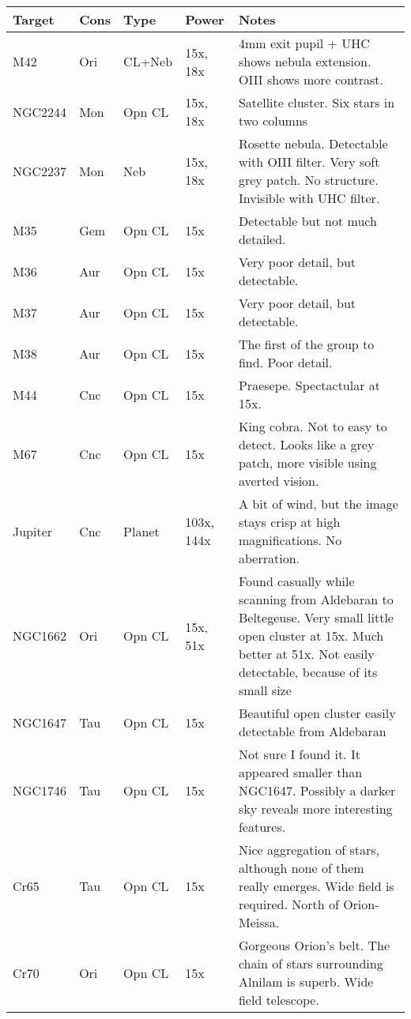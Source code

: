 \begin{longtable}{ p{0.8in}  p{0.3in}  p{0.5in}  p{0.9in}  p{5.8in} }
\hline 
{\bf Target} & {\bf Cons} & {\bf Type} & {\bf Power} & {\bf Notes} \\ 
\hline 
M42 & Ori & CL+Neb & 15x, 18x & 4mm exit pupil + UHC shows nebula extension. OIII shows more contrast. \\ 
NGC2244 & Mon & Opn CL & 15x, 18x & Satellite cluster. Six stars in two columns  \\ 
NGC2237 & Mon & Neb & 15x, 18x & Rosette nebula. Detectable with OIII filter. Very soft grey patch. No structure. Invisible with UHC filter. \\ 
M35 & Gem & Opn CL & 15x & Detectable but not much detailed. \\ 
M36 & Aur & Opn CL & 15x & Very poor detail, but detectable.  \\ 
M37 & Aur & Opn CL & 15x & Very poor detail, but detectable.  \\ 
M38 & Aur & Opn CL & 15x & The first of the group to find. Poor detail. \\ 
M44 & Cnc & Opn CL & 15x & Praesepe. Spectactular at 15x. \\ 
M67 & Cnc & Opn CL & 15x & King cobra. Not to easy to detect. Looks like a grey patch, more visible using averted vision. \\ 
Jupiter & Cnc & Planet & 103x, 144x & A bit of wind, but the image stays crisp at high magnifications. No aberration. \\ 
NGC1662 & Ori & Opn CL & 15x, 51x & Found casually while scanning from Aldebaran to Beltegeuse. Very small little open cluster at 15x. Much better at 51x. Not easily detectable, because of its small size \\ 
NGC1647 & Tau & Opn CL & 15x  & Beautiful open cluster easily detectable from Aldebaran \\ 
NGC1746 & Tau & Opn CL & 15x & Not sure I found it. It appeared smaller than NGC1647. Possibly a darker sky reveals more interesting features. \\ 
Cr65 & Tau & Opn CL & 15x & Nice aggregation of stars, although none of them really emerges. Wide field is required. North of Orion-Meissa. \\ 
Cr70 & Ori & Opn CL & 15x & Gorgeous Orion's belt. The chain of stars surrounding Alnilam is superb. Wide field telescope. \\ 
\hline 
\end{longtable} 
